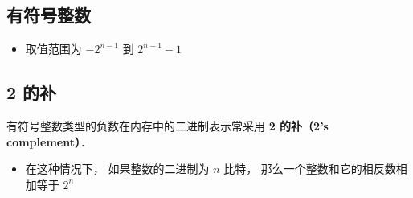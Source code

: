 
\subsection{有符号整数}
\begin{itemize}
\item 取值范围为 $-2^{n-1}$ 到 $2^{n-1}-1$
\end{itemize}



\subsection{2 的补}
有符号整数类型的负数在内存中的二进制表示常采用 \textbf{2 的补（2's complement）}．
\begin{itemize}
\item 在这种情况下， 如果整数的二进制为 $n$ 比特， 那么一个整数和它的相反数相加等于 $2^n$
\end{itemize}
